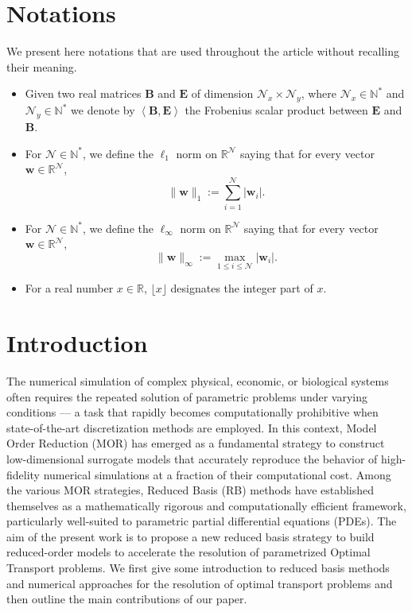 \documentclass{article}
\def\RR{\mathbb{R}}
\def\N{\mathbb{N}}
\def\cN{\mathcal{N}}
\def\ww{\mathbf{w}}
\begin{document}
\section*{Notations}
We present here notations that are used throughout the article without recalling their meaning.
%
\begin{itemize}
    \item Given two real matrices $\mathbf{B}$ and $\mathbf{E}$ of dimension $\cN_x \times \cN_y$, where $\cN_x \in \N^*$ and $\cN_y \in \N^*$ we denote by $\left\langle \textbf{B}, \textbf{E} \right\rangle$ the Frobenius scalar product between $\textbf{E}$ and $\textbf{B}$.
    \item For $\cN \in \N^*$, we define the $\ell_1$ norm on $\RR^{\cN}$ saying that for every vector $\ww \in \RR^\cN$,
        \begin{equation*}
            \| \ww \|_1 := \sum_{i = 1}^{\cN} |\ww_i|.
        \end{equation*}
    \item For $\cN \in \N^*$, we define the $\ell_\infty$ norm on $\RR^{\cN}$ saying that for every vector $\ww \in \RR^\cN$,
        \begin{equation*}
            \| \ww \|_\infty := \max_{1 \leq i \leq \cN} |\ww_i|.
        \end{equation*}
    \item For a real number $x \in \RR $, $\lfloor x \rfloor$ designates the integer part of $x$.
\end{itemize}






\section{Introduction}
%
The numerical simulation of complex physical, economic, or biological systems often requires the repeated solution of parametric problems under varying conditions — a task that rapidly becomes computationally prohibitive when state-of-the-art discretization methods are employed. In this context, Model Order Reduction (MOR) has emerged as a fundamental strategy to construct low-dimensional surrogate models that accurately reproduce the behavior of high-fidelity numerical simulations at a fraction of their computational cost. Among the various MOR strategies, Reduced Basis (RB) methods have established themselves as a mathematically rigorous and computationally efficient framework, particularly well-suited to parametric partial differential equations (PDEs). The aim of the present work is to propose a new reduced basis strategy to build reduced-order models to accelerate the resolution of parametrized Optimal Transport problems. We first give some introduction to reduced basis methods and numerical approaches for the resolution of optimal transport problems and then outline the main contributions of our paper. 
\end{document}
